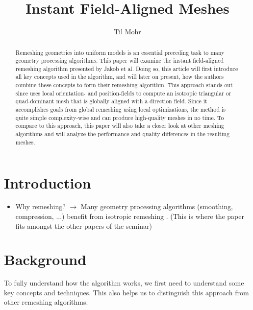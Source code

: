 \documentclass{ACGSeminar}
\begin{document}
\title{Instant Field-Aligned Meshes}

\author{Til Mohr}


\maketitle


\begin{abstract}
Remeshing geometries into uniform models is an essential preceding task to many geometry processing algorithms. This paper will examine the instant field-aligned remeshing algorithm presented by Jakob et al. Doing so, this article will first introduce all key concepts used in the algorithm, and will later on present,
how the authors combine these concepts to form their remeshing algorithm. This approach stands out since uses local orientation- and position-fields to compute an isotropic triangular or quad-dominant mesh that is globally aligned with a direction field. Since it accomplishes goals from global remeshing using local optimizations, the method is quite simple complexity-wise and can produce high-quality meshes in no time. To compare to this approach, this paper will also take a closer look at other meshing algorithms and will analyze the performance and quality differences in the resulting meshes.
\end{abstract}

\tableofcontents

\newpage

\label{cha:introduction}
\section{Introduction}
\begin{itemize}
	\item	Why remeshing? $\rightarrow$ Many geometry processing algorithms (smoothing, compression, ...) benefit from isotropic remeshing \cite{surazhsky2003isotropic}. (This is where the paper fits amongst the other papers of the seminar)
\end{itemize}

\section{Background}
To fully understand how the algorithm works, we first need to understand some key concepts and techniques. This also helps us to distinguish this approach from other remeshing algorithms.
\end{document}
